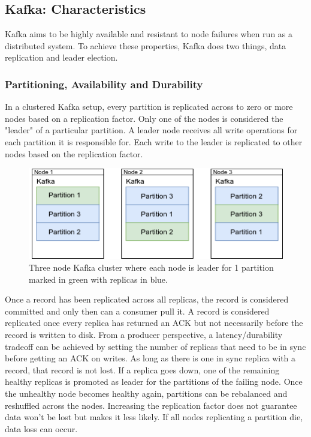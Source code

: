 \documentclass[11pt]{article}
\begin{document}
\subsection{Kafka: Characteristics}
Kafka aims to be highly available and resistant to node failures when run as a distributed system. To achieve these properties, Kafka does two things, data replication and leader election.

\subsubsection{Partitioning, Availability and Durability}
In a clustered Kafka setup, every partition is replicated across to zero or more nodes based on a replication factor\cite{kafka-replication-factor}. Only one of the nodes is considered the "leader" of a particular partition\cite{kafka-replication}. A leader node receives all write operations for each partition it is responsible for. Each write to the leader is replicated to other nodes based on the replication factor.


\begin{figure}[htbp]
\centerline{\includegraphics[scale=0.8]{assets/replication.png}}
\caption{Three node Kafka cluster where each node is leader for 1 partition marked in green with replicas in blue.}
\label{fig}
\end{figure}
Once a record has been replicated across all replicas, the record is considered committed and only then can a consumer pull it. A record is considered replicated once every replica has returned an ACK but not necessarily before the record is written to disk.
\newline
\newline
From a producer perspective, a latency/durability tradeoff can be achieved by setting the number of replicas that need to be in sync before getting an ACK on writes. As long as there is one in sync replica with a record, that record is not lost. If a replica goes down, one of the remaining healthy replicas is promoted as leader for the partitions of the failing node. Once the unhealthy node becomes healthy again, partitions can be rebalanced and reshuffled across the nodes\cite{kafka-partition-shuffling}. Increasing the replication factor does not guarantee data won't be lost but makes it less likely. If all nodes replicating a partition die, data loss can occur.
\newline
\newline
\end{document}
